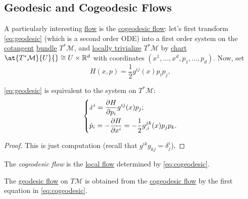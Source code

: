 \subsection{Geodesic and Cogeodesic Flows}
A particularly interesting \hyperref[def:local-flow]{flow} is the \hyperref[def:cogeodesic-flow]{cogeodesic flow}: let's first transform \autoref{eq:geodesic} (which is a second order ODE) into a first order system on the \hyperref[def:cotangent-space]{cotangent} \hyperref[def:vector-bundle]{bundle} \(T^{\ast} \mathcal{M} \), and \hyperref[def:local-trivialization]{locally trivialize} \(T^{\ast} \mathcal{M} \) by \hyperref[def:coordinate-chart]{chart} \(\at{T^{\ast} \mathcal{M} }{U}{} \cong U \times \mathbb{R} ^d\) with coordinates \((x^1, \dots , x^d, p_1, \dots , p_d)\). Now, set
\begin{equation}\label{eq:Hamilton}
	H(x, p) = \frac{1}{2} g^{ij} (x) p_i p_j,
\end{equation}

\begin{theorem}
	\autoref{eq:geodesic} is equivalent to the system on \(T^{\ast} \mathcal{M} \):
	\begin{equation}\label{eq:cogeodesic}
		\begin{dcases}
			\dot{x}^i = \frac{\partial H}{\partial p_i} g^{ij}(x) p_j; \\
			\dot{p}_i = -\frac{\partial H}{\partial x^i} = -\frac{1}{2} g^{jk}_{, i}(x)p_j p_k.
		\end{dcases}
	\end{equation}
\end{theorem}
\begin{proof}
	This is just computation (recall that \(g^{ik} g_{kj} = \delta ^i_j \)).
\end{proof}

\begin{definition}\label{def:cogeodesic-flow}
	The \emph{cogeodesic flow} is the \hyperref[def:local-flow]{local flow} determined by \autoref{eq:cogeodesic}.
\end{definition}

\begin{definition}\label{def:geodesic-flow}
	The \hyperref[def:geodesic-flow]{geodesic flow} on \(T\mathcal{M} \) is obtained from the \hyperref[def:cogeodesic-flow]{cogeodesic flow} by the first equation in \autoref{eq:cogeodesic}.
\end{definition}

